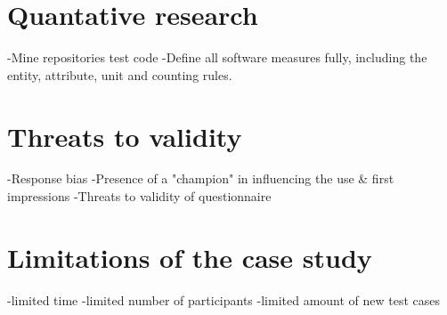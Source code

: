 \section{Quantative research}
-Mine repositories test code\newline
    -Define all software measures fully, including the entity, attribute, unit and counting rules.

\section{Threats to validity}
-Response bias\newline
-Presence of a "champion" in influencing the use & first impressions\newline
-Threats to validity of questionnaire\newline\newline
\section{Limitations of the case study}
-limited time\newline
-limited number of participants\newline
-limited amount of new test cases\newline


